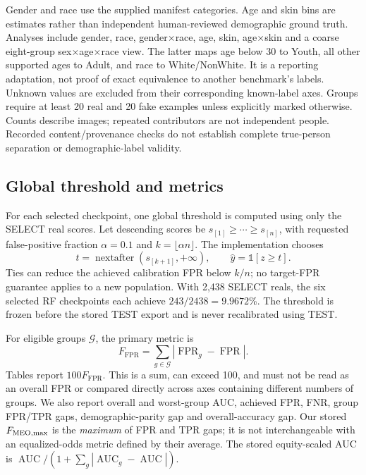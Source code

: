 \documentclass[10pt,twocolumn,letterpaper]{article}
\newcommand{\ffpr}{F_{\mathrm{FPR}}}
\begin{document}
Gender and race use the supplied manifest categories. Age and skin bins are estimates rather than independent
human-reviewed demographic ground truth. Analyses include gender, race, gender$\times$race, age, skin,
age$\times$skin and a coarse eight-group sex$\times$age$\times$race view.
The latter maps age below 30 to Youth, all other supported ages to Adult, and race to White/NonWhite.
It is a reporting adaptation, not proof of exact equivalence to another benchmark's labels.
Unknown values are excluded from their corresponding known-label axes.
Groups require at least 20 real and 20 fake examples unless explicitly marked otherwise.
Counts describe images; repeated contributors are not independent people.
Recorded content/provenance checks do not establish complete true-person separation or demographic-label validity.

\subsection{Global threshold and metrics}
For each selected checkpoint, one global threshold is computed using only the SELECT real scores.
Let descending scores be $s_{[1]}\ge\cdots\ge s_{[n]}$, with requested false-positive fraction $\alpha=0.1$
and $k=\lfloor\alpha n\rfloor$. The implementation chooses
\begin{equation}
 t=\operatorname{nextafter}(s_{[k+1]},+\infty),\qquad \widehat y=\mathbb{1}[z\ge t].
\end{equation}
Ties can reduce the achieved calibration FPR below $k/n$; no target-FPR guarantee applies to a new population.
With 2,438 SELECT reals, the six selected RF checkpoints each achieve $243/2438=9.9672$\%.
The threshold is frozen before the stored TEST export and is never recalibrated using TEST.

For eligible groups $\mathcal G$, the primary metric is
\begin{equation}
 \ffpr=\sum_{g\in\mathcal G}|\operatorname{FPR}_g-\operatorname{FPR}|.
 \label{eq:ffpr}
\end{equation}
Tables report $100\ffpr$. This is a sum, can exceed 100, and must not be read as an overall FPR or
compared directly across axes containing different numbers of groups.
We also report overall and worst-group AUC, achieved FPR, FNR, group FPR/TPR gaps,
demographic-parity gap and overall-accuracy gap.
Our stored $F_{\rm MEO,max}$ is the \emph{maximum} of FPR and TPR gaps;
it is not interchangeable with an equalized-odds metric defined by their average.
The stored equity-scaled AUC is
$\operatorname{AUC}/(1+\sum_g|\operatorname{AUC}_g-\operatorname{AUC}|)$.
\end{document}
